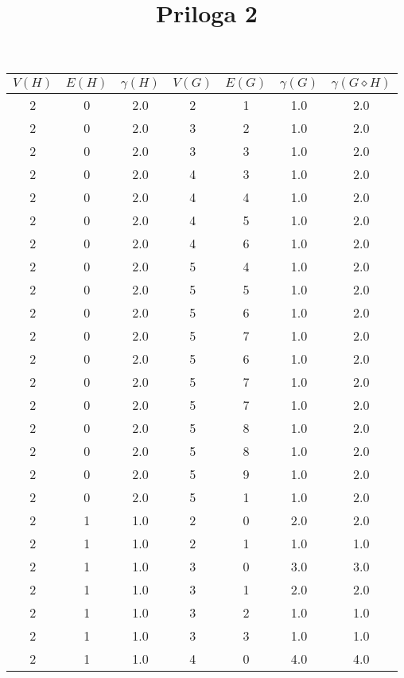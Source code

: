 \documentclass[a4paper,12pt]{article}
\begin{document}
\title{Priloga 2}

\maketitle

\begin{center}
    \begin{longtable}{ c c c | c c c | c }
        $V(H)$ & $E(H)$ & $\gamma(H)$ & $V(G)$ & $E(G)$ & $\gamma(G)$ & $\gamma(G \diamond H)$ \\
        \hline
        2 & 0 & 2.0 & 2 & 1 & 1.0 & 2.0 \\
        2 & 0 & 2.0 & 3 & 2 & 1.0 & 2.0 \\
        2 & 0 & 2.0 & 3 & 3 & 1.0 & 2.0 \\
        2 & 0 & 2.0 & 4 & 3 & 1.0 & 2.0 \\
        2 & 0 & 2.0 & 4 & 4 & 1.0 & 2.0 \\
        2 & 0 & 2.0 & 4 & 5 & 1.0 & 2.0 \\
        2 & 0 & 2.0 & 4 & 6 & 1.0 & 2.0 \\
        2 & 0 & 2.0 & 5 & 4 & 1.0 & 2.0 \\
        2 & 0 & 2.0 & 5 & 5 & 1.0 & 2.0 \\
        2 & 0 & 2.0 & 5 & 6 & 1.0 & 2.0 \\
        2 & 0 & 2.0 & 5 & 7 & 1.0 & 2.0 \\
        2 & 0 & 2.0 & 5 & 6 & 1.0 & 2.0 \\
        2 & 0 & 2.0 & 5 & 7 & 1.0 & 2.0 \\
        2 & 0 & 2.0 & 5 & 7 & 1.0 & 2.0 \\
        2 & 0 & 2.0 & 5 & 8 & 1.0 & 2.0 \\
        2 & 0 & 2.0 & 5 & 8 & 1.0 & 2.0 \\
        2 & 0 & 2.0 & 5 & 9 & 1.0 & 2.0 \\
        2 & 0 & 2.0 & 5 & 1 & 1.0 & 2.0 \\
        2 & 1 & 1.0 & 2 & 0 & 2.0 & 2.0 \\
        2 & 1 & 1.0 & 2 & 1 & 1.0 & 1.0 \\
        2 & 1 & 1.0 & 3 & 0 & 3.0 & 3.0 \\
        2 & 1 & 1.0 & 3 & 1 & 2.0 & 2.0 \\
        2 & 1 & 1.0 & 3 & 2 & 1.0 & 1.0 \\
        2 & 1 & 1.0 & 3 & 3 & 1.0 & 1.0 \\
        2 & 1 & 1.0 & 4 & 0 & 4.0 & 4.0 \\

\end{longtable}
\end{center}
\end{document}
